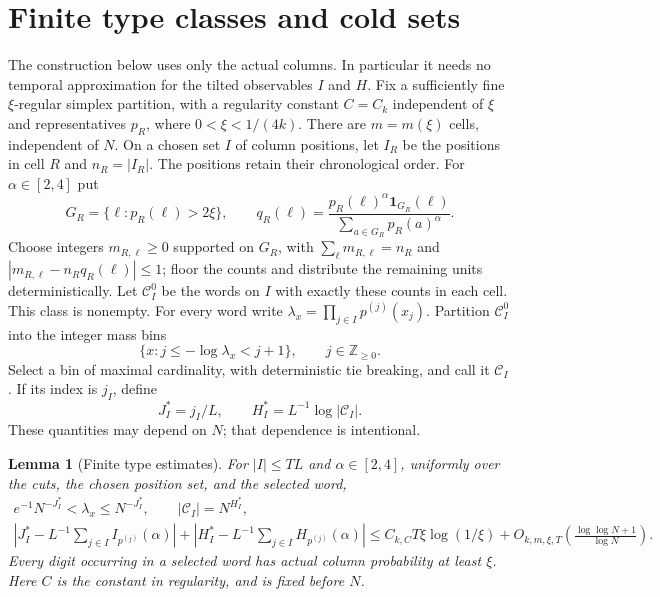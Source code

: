 \documentclass[11pt]{article}
\numberwithin{equation}{section}
\newtheorem{lemma}[lemma]{Lemma}
\newcommand{\1}{\mathbf 1}
\begin{document}
\section{Finite type classes and cold sets}

The construction below uses only the actual columns.  In particular it
needs no temporal approximation for the tilted observables $I$ and $H$.
Fix a sufficiently fine $\xi$-regular simplex partition, with a regularity constant $C=C_k$ independent of $\xi$ and representatives
$p_R$, where $0<\xi<1/(4k)$.  There are $m=m(\xi)$ cells, independent of $N$.
On a chosen set $I$ of column positions, let $I_R$ be the positions in cell
$R$ and $n_R=|I_R|$.  The positions retain their chronological order.
For $\alpha\in[2,4]$ put
\[
 G_R=\{\ell:p_R(\ell)>2\xi\},\qquad
 q_R(\ell)=\frac{p_R(\ell)^\alpha\mathbf1_{G_R}(\ell)}
                 {\sum_{a\in G_R}p_R(a)^\alpha}.
\]
Choose integers $m_{R,\ell}\ge0$ supported on $G_R$, with
$\sum_\ell m_{R,\ell}=n_R$ and
$|m_{R,\ell}-n_Rq_R(\ell)|\le1$; floor the counts and distribute the
remaining units deterministically.  Let $\mathcal C^0_I$ be the words on
$I$ with exactly these counts in each cell.  This class is nonempty.
For every word write $\lambda_x=\prod_{j\in I}p^{(j)}(x_j)$.
Partition $\mathcal C^0_I$ into the integer mass bins
\[
 \{x:j\le-\log\lambda_x<j+1\},\qquad j\in\mathbb Z_{\ge0}.
\]
Select a bin of maximal cardinality, with deterministic tie breaking, and
call it $\mathcal C_I$.  If its index is $j_I$, define
\[
 J_I^*=j_I/L,\qquad H_I^*=L^{-1}\log|\mathcal C_I|.
\]
These quantities may depend on $N$; that dependence is intentional.

\begin{lemma}[Finite type estimates]\label{lem:type-estimates}
For $|I|\le TL$ and $\alpha\in[2,4]$, uniformly over the cuts, the chosen
position set, and the selected word,
\begin{gather}
 e^{-1}N^{-J_I^*}<\lambda_x\le N^{-J_I^*},\qquad
 |\mathcal C_I|=N^{H_I^*},\label{eq:repair-bin-exact}\\
 \left|J_I^*-L^{-1}\sum_{j\in I}I_{p^{(j)}}(\alpha)\right|
 +\left|H_I^*-L^{-1}\sum_{j\in I}H_{p^{(j)}}(\alpha)\right|
 \le C_{k,C}T\xi\log(1/\xi)
       +O_{k,m,\xi,T}\!\left(\frac{\log\log N+1}{\log N}\right).
 \label{eq:repair-types-error}
\end{gather}
Every digit occurring in a selected word has actual column probability
at least $\xi$.  Here $C$ is the constant in regularity, and is fixed before
$N$.
\end{lemma}
\end{document}
